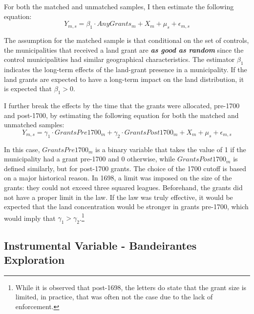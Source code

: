 \documentclass[11pt]{article}
\begin{document}
For both the matched and unmatched samples, I then estimate the following equation:
\begin{equation}
  \label{eqn:ols_matching_all}
  Y_{m,s} = \beta_1 \cdot AnyGrants_m + X_{m} + \mu_s + \epsilon_{m,s}
\end{equation}

The assumption for the matched sample is that conditional on the set of controls, the municipalities that received a land grant are \textbf{\textit{as good as random}} since the control municipalities had similar geographical characteristics. 
The estimator $\beta_1$ indicates the long-term effects of the land-grant presence in a municipality. 
If the land grants are expected to have a long-term impact on the land distribution, it is expected that $\beta_1 > 0$.

I further break the effects by the time that the grants were allocated, pre-1700 and post-1700, by estimating the following equation for both the matched and unmatched samples:
\begin{equation}
  \label{eqn:ols_matching}
  Y_{m,s} = \gamma_1 \cdot GrantsPre1700_m + \gamma_2 \cdot GrantsPost1700_m + X_{m} + \mu_s + \epsilon_{m,s}
\end{equation}

In this case, $GrantsPre1700_m$ is a binary variable that takes the value of 1 if the municipality had a grant pre-1700 and 0 otherwise, while $GrantsPost1700_m$ is defined similarly, but for post-1700 grants.
The choice of the 1700 cutoff is based on a major historical reason. In 1698, a limit was imposed on the size of the grants: they could not exceed three squared leagues. 
Beforehand, the grants did not have a proper limit in the law.
If the law was truly effective, it would be expected that the land concentration would be stronger in grants pre-1700, which would imply that $\gamma_1 > \gamma_2$.\footnote{While it is observed that post-1698, the letters do state that the grant size is limited, in practice, that was often not the case due to the lack of enforcement.}


\subsection{Instrumental Variable - Bandeirantes Exploration}
\label{sec:iv} 
\end{document}

